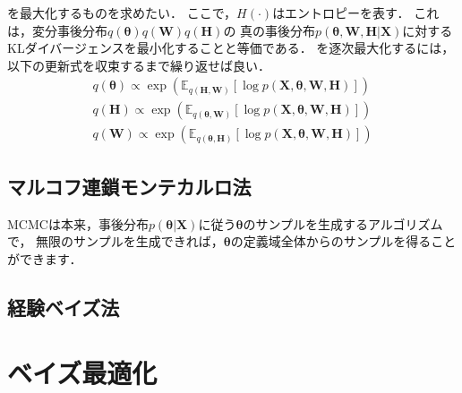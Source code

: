 を最大化するものを求めたい．
ここで，$H(\cdot)$はエントロピーを表す．
これは，変分事後分布$q(\bm\theta) q(\bm{W}) q(\bm{H})$の
真の事後分布$p(\bm\theta,\bm{W},\bm{H}|\bm{X})$に対するKLダイバージェンスを最小化することと等価である．
を逐次最大化するには，
以下の更新式を収束するまで繰り返せば良い．
\begin{eqnarray}
 \!\!
 q(\bm\theta) \propto \exp(\mathbb{E}_{q(\bm{H},\bm{W})}[\log p(\bm{X},\bm\theta,\bm{W},\bm{H})])
 \label{eqn:q_t}
 \\
 \!\!
 q(\bm{H}) \propto \exp(\mathbb{E}_{q(\bm\theta,\bm{W})}[\log p(\bm{X},\bm\theta,\bm{W},\bm{H})])
 \label{eqn:q_w}
 \\
 \!\!
 q(\bm{W}) \propto \exp(\mathbb{E}_{q(\bm\theta,\bm{H})}[\log p(\bm{X},\bm\theta,\bm{W},\bm{H})]) 
 \label{eqn:q_h}
\end{eqnarray}

\subsection{マルコフ連鎖モンテカルロ法}
\label{sec:mcmc}

MCMCは本来，事後分布$p(\bm\theta|\bm{X})$に従う$\bm\theta$のサンプルを生成するアルゴリズムで，
無限のサンプルを生成できれば，$\bm\theta$の定義域全体からのサンプルを得ることができます．

\subsection{経験ベイズ法}

\section{ベイズ最適化}

